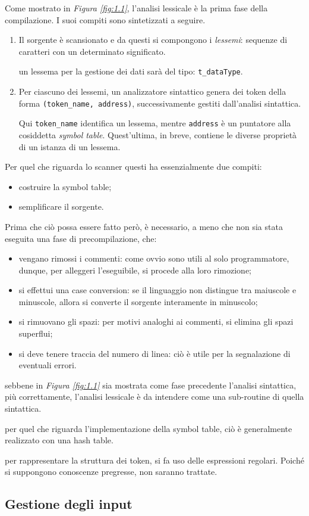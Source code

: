 \documentclass{subfiles}
\begin{document}
Come mostrato in \emph{Figura \ref{fig:1.1}}, l'analisi lessicale è la prima fase della compilazione.
I suoi compiti sono sintetizzati a seguire.
\begin{enumerate}
    \item Il sorgente è scansionato e da questi si compongono i \emph{lessemi}: sequenze di caratteri con un determinato significato.
          \begin{Example*}
              un lessema per la gestione dei dati sarà del tipo: \lstinline{t_dataType}.
          \end{Example*}

    \item Per ciascuno dei lessemi, un analizzatore sintattico genera dei token della forma \lstinline{(token_name, address)},
          successivamente gestiti dall'analisi sintattica.

          Qui \lstinline{token_name} identifica un lessema, mentre \lstinline{address} è un puntatore alla cosiddetta \emph{symbol table}.
          Quest'ultima, in breve, contiene le diverse proprietà di un istanza di un lessema.
\end{enumerate}

Per quel che riguarda lo scanner questi ha essenzialmente due compiti:
\begin{itemize}
    \item costruire la symbol table;
    \item semplificare il sorgente.
\end{itemize}

Prima che ciò possa essere fatto però, è necessario, a meno che non sia stata eseguita una fase di precompilazione, che:
\begin{itemize}
    \item vengano rimossi i commenti: come ovvio sono utili al solo programmatore, dunque, per alleggeri l'eseguibile, si procede alla loro rimozione;
    \item si effettui una case conversion: se il linguaggio non distingue tra maiuscole e minuscole, allora si converte il sorgente interamente in minuscolo;
    \item si rimuovano gli spazi: per motivi analoghi ai commenti, si elimina gli spazi superflui;
    \item si deve tenere traccia del numero di linea: ciò è utile per la segnalazione di eventuali errori.
\end{itemize}

\begin{Note*}
    sebbene in \emph{Figura \ref{fig:1.1}} sia mostrata come fase precedente l'analisi sintattica, più correttamente,
    l'analisi lessicale è da intendere come una sub-routine di quella sintattica.
\end{Note*}
\begin{Note*}
    per quel che riguarda l'implementazione della symbol table, ciò è generalmente realizzato con una hash table.
\end{Note*}
\begin{Note*}
    per rappresentare la struttura dei token, si fa uso delle espressioni regolari.
    Poiché si suppongono conoscenze pregresse, non saranno trattate.
\end{Note*}

\subsection{Gestione degli input}

\clearpage
\end{document}
